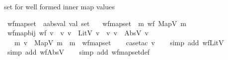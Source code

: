 \begin{isabellebody}
%
\endisadelimdocument
%
\begin{isamarkuptext}%
set for well formed inner map values%
\end{isamarkuptext}\isamarkuptrue%
\isamarkupfalse%
\ wf{\isacharunderscore}{\kern0pt}map{\isacharunderscore}{\kern0pt}set\ {\isacharcolon}{\kern0pt}{\isacharcolon}{\kern0pt}\ {\isachardoublequoteopen}{\isacharprime}{\kern0pt}a{\isacharcolon}{\kern0pt}{\isacharcolon}{\kern0pt}absval\ val{}{}{}\ set{\isachardoublequoteclose}\ \isanewline
\ \ {\isachardoublequoteopen}wf{\isacharunderscore}{\kern0pt}map{\isacharunderscore}{\kern0pt}set\ {\isacharequal}{\kern0pt}\ {\isacharbraceleft}{\kern0pt}m{\isachardot}{\kern0pt}\ wf\ {\isacharparenleft}{\kern0pt}MapV\ m{\isacharparenright}{\kern0pt}{\isacharbraceright}{\kern0pt}{\isachardoublequoteclose}\isanewline
\isanewline
\isanewline
{}\isamarkupfalse%
\ wf{\isacharunderscore}{\kern0pt}map{\isacharunderscore}{\kern0pt}bij{\isacharcolon}{\kern0pt}\ {\isachardoublequoteopen}wf\ v\ {\isasymlongleftrightarrow}\ {\isacharparenleft}{\kern0pt}{\isasymexists}v{\isacharprime}{\kern0pt}{\isachardot}{\kern0pt}\ v\ {\isacharequal}{\kern0pt}\ LitV\ v{\isacharprime}{\kern0pt}{\isacharparenright}{\kern0pt}\ {\isasymor}\ {\isacharparenleft}{\kern0pt}{\isasymexists}v{\isacharprime}{\kern0pt}{\isachardot}{\kern0pt}\ v\ {\isacharequal}{\kern0pt}\ AbsV\ v{\isacharprime}{\kern0pt}{\isacharparenright}{\kern0pt}\isanewline
\ \ {\isasymor}\ {\isacharparenleft}{\kern0pt}{\isasymexists}m{\isacharprime}{\kern0pt}{\isachardot}{\kern0pt}\ v\ {\isacharequal}{\kern0pt}\ MapV\ m{\isacharprime}{\kern0pt}\ {\isasymand}\ m{\isacharprime}{\kern0pt}\ {\isasymin}\ wf{\isacharunderscore}{\kern0pt}map{\isacharunderscore}{\kern0pt}set{\isacharparenright}{\kern0pt}{\isachardoublequoteclose}\isanewline
%
\isadelimproof
\ \ %
\endisadelimproof
%
\isatagproof
{}\isamarkupfalse%
\ {\isacharparenleft}{\kern0pt}case{\isacharunderscore}{\kern0pt}tac\ v{\isacharparenright}{\kern0pt}\isanewline
\ \ \isamarkupfalse%
\ {\isacharparenleft}{\kern0pt}simp\ add{\isacharcolon}{\kern0pt}\ wfLitV{\isacharparenright}{\kern0pt}\isanewline
\ \ \isamarkupfalse%
\ {\isacharparenleft}{\kern0pt}simp\ add{\isacharcolon}{\kern0pt}\ wfAbsV{\isacharparenright}{\kern0pt}\isanewline
\ \ \isamarkupfalse%
\ {\isacharparenleft}{\kern0pt}simp\ add{\isacharcolon}{\kern0pt}\ wf{\isacharunderscore}{\kern0pt}map{\isacharunderscore}{\kern0pt}set{\isacharunderscore}{\kern0pt}def{\isacharparenright}{\kern0pt}%

\end{isabellebody}
